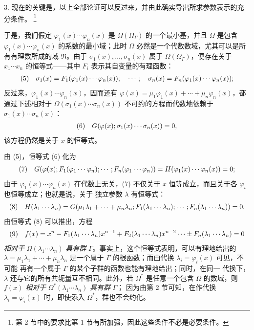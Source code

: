 \documentclass[11pt]{article}
\providecommand{\srcfn}[2]{%
  \begingroup
  \renewcommand{\thefootnote}{#1}%
  \footnote{#2}%
  \addtocounter{footnote}{-1}%
  \endgroup}
\begin{document}
3. 现在的关键是，以上全部论证可以反过来，并由此确实导出所求参数表示的充分条件。\srcfn{*)}{第 2 节中的要求比第 1 节有所加强，因此这些条件不必是必要条件。}于是，我们假定 $\varphi_1(x)\cdots\varphi_n(x)$ 是 $\Omega(\Omega_\Gamma)$ 的一个最小基，并且 $\Omega$ 是包含 $\varphi_1(x)\cdots\varphi_n(x)$ 的系数的最小域；此时 $\Omega$ 必然是一个代数数域，尤其可以是所有有理数所成的域 $\mathfrak R$。由于 $\sigma_1(x),\ldots,\sigma_n(x)$ 属于 $\Omega(\Omega_\Gamma)$，便存在关于 $x_1\cdots x_n$ 的恒等式——其中 $F_i$ 表示其自变量的有理函数：
\[
\begin{array}{@{}l@{\quad}l@{}}
(5)& \displaystyle \sigma_1(x)=F_1(\varphi_1(x)\cdots\varphi_n(x));\quad \cdots;\quad \sigma_n(x)=F_n(\varphi_1(x)\cdots\varphi_n(x));
\end{array}
\]
反过来，$\varphi_1(x)\cdots\varphi_n(x)$，因而还有 $\varphi(x)=\mu_1\varphi_1(x)+\cdots+\mu_n\varphi_n(x)$，都通过下述相对于 $\Omega(\sigma_1(x)\cdots\sigma_n(x))$ 不可约的方程而代数地依赖于 $\sigma_1(x)\cdots\sigma_n(x)$：
\[
\begin{array}{@{}l@{\quad}l@{}}
(6)& \displaystyle G(\varphi(x);\sigma_1(x)\cdots\sigma_n(x))=0,
\end{array}
\]
该方程仍然是关于 $x$ 的恒等式。

由 (5)，恒等式 (6) 化为
\[
\begin{array}{@{}l@{\quad}l@{}}
(7)& \displaystyle G(\varphi(x);F_1(\varphi_1\cdots\varphi_n);\cdots;F_n(\varphi_1\cdots\varphi_n)) =H(\varphi_1(x)\cdots\varphi_n(x))=0;
\end{array}
\]
由于 $\varphi_1(x)\cdots\varphi_n(x)$ 在代数上无关，(7) 不仅关于
$x$ 恒等成立，而且关于各 $\varphi_i$ 也恒等成立；也就是说，关于
独立参数 $\lambda$ 有恒等式：
\[
\begin{array}{@{}l@{\quad}l@{}}
(8)& \displaystyle H(\lambda_1\cdots\lambda_n)=G(\mu_1\lambda_1+\cdots+\mu_n\lambda_n;F_1(\lambda_1\cdots\lambda_n);\cdots;F_n(\lambda_1\cdots\lambda_n))=0.
\end{array}
\]
由恒等式 (8) 可以推出，方程
\[
\begin{array}{@{}l@{\quad}l@{}}
(9)& \displaystyle f(x)=x^n-F_1(\lambda_1\cdots\lambda_n)x^{n-1}+F_2(\lambda_1\cdots\lambda_n)x^{n-2}\cdots\pm F_n(\lambda_1\cdots\lambda_n)=0
\end{array}
\]
\emph{相对于} $\Omega(\lambda_1\cdots\lambda_n)$ \emph{具有群}
$\Gamma$。事实上，这个恒等式表明，可以有理地给出的
$\lambda=\mu_1\lambda_1+\cdots+\mu_n\lambda_n$ 是一个属于
$\Gamma$ 的根函数；而由代换 $\lambda_i=\varphi_i(x)$ 可见，不可能
再有一个属于 $\Gamma$ 的某个子群的函数也能有理地给出；同时，在同一
代换下，$\lambda$ 还与它的所有共轭量互不相同。此外，若 $\Omega^*$
是任意一个包含 $\Omega$ 的数域，则 $f(x)$ \emph{相对于}
$\Omega^*(\lambda_1\cdots\lambda_n)$ \emph{具有群} $\Gamma$；
因为由第 2 节可知，在作代换 $\lambda_i=\varphi_i(x)$ 时，即使添入
$\Omega^*$，群也不会约化。
\end{document}
